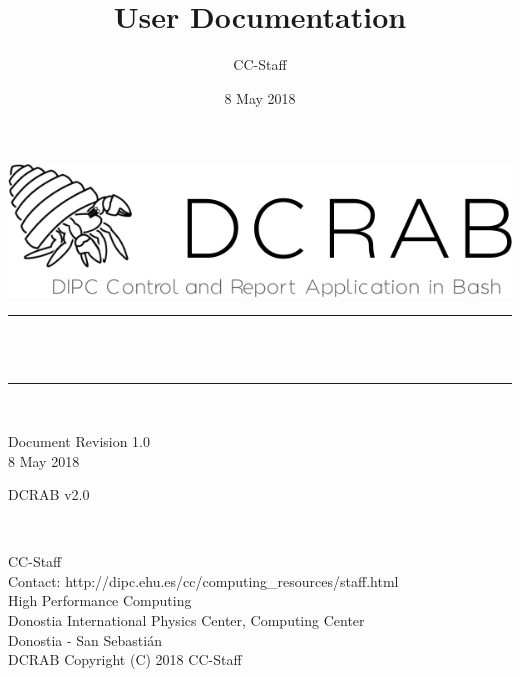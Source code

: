 \documentclass[10pt,a4paper]{report}
\author{CC-Staff}
\title{User Documentation}
\date{8 May 2018}
\makeatletter
\let\thetitle\@title
\makeatother
\begin{document}

\begin{titlepage}
	\centering
    \vspace*{3 cm}
    \includegraphics[scale = 0.6]{../auxFiles/logos/DCRAB_logo.png}\\[1.0 cm]
		\vspace*{2 cm}
	\rule{\linewidth}{0.2 mm} \\[0.4 cm]
	{ \huge \bfseries \thetitle}\\
	\rule{\linewidth}{0.2 mm} \\[0.4 cm]
\vspace*{4.5 cm}
	\begin{minipage}{0.4\textwidth}
		\begin{flushleft} \large
			Document Revision 1.0\\
			8 May 2018\\
			\end{flushleft}
			\end{minipage}
			\begin{minipage}{0.4 \textwidth}
			\begin{flushright} \large
			DCRAB v2.0\\
		\end{flushright}
	\end{minipage}\\[2 cm]

\newpage
\thispagestyle{empty}
\begin{flushleft}
CC-Staff \\
Contact: http://dipc.ehu.es/cc/computing\_resources/staff.html \\
High Performance Computing \\
Donostia International Physics Center, Computing Center \\
Donostia - San Sebasti\'an \\
\vspace{1cm}
DCRAB Copyright (C) 2018 CC-Staff
\end{flushleft}

\newpage
\end{titlepage}
\end{document}
